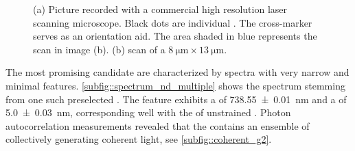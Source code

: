 			\begin{figure}[htp]
				\begin{subfigure}[t]{ 0.49\linewidth}
					\centering
					\caption{}
					\label{subfig::cross_laser_scan}
				\end{subfigure}
				\hfill
				\begin{subfigure}[t]{ 0.49\linewidth}
					\centering
					\caption{}
					\label{subfig::pp_pl_scan}
				\end{subfigure}
				\caption[Localizing suitable \nds]{(a) Picture recorded with a commercial high resolution laser scanning microscope. Black dots are individual \nds. The cross-marker serves as an orientation aid. The area shaded in blue represents the \pl scan in image (b). (b) \Pl scan of a
				$\SI{8}{\micro\metre} \times \SI{13}{\micro\metre}$. }
			\end{figure}

			The most promising candidate \nds are characterized by \fl spectra with very narrow \zpls and minimal \psb features. 
			\autoref{subfig::spectrum_nd_multiple} shows the spectrum stemming from one such preselected \nd.
			The \ZPL feature exhibits a \cwl of \SI[separate-uncertainty = true]{738.55\pm0.01}{nm} and a \lw of \SI[separate-uncertainty = true]{5.0\pm0.03}{nm}, corresponding well with the \ZPL of unstrained \sivs. Photon autocorrelation measurements revealed that the \nd  contains an ensemble of \sivs collectively generating coherent \fl light, see \autoref{subfig::coherent_g2}.

